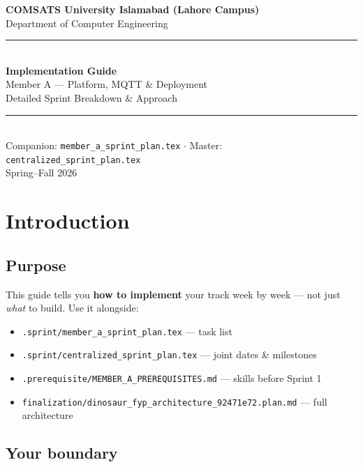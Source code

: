 \documentclass[12pt,a4paper]{report}
\begin{document}
\begin{titlepage}
\centering
\vspace*{1cm}
{\Large\color{primary}\textbf{COMSATS University Islamabad (Lahore Campus)}}\\[0.3cm]
{\large Department of Computer Engineering}\\[1cm]
\rule{\textwidth}{2pt}\\[0.8cm]
{\Huge\bfseries\color{primary} Implementation Guide}\\[0.4cm]
{\Large Member A --- Platform, MQTT \& Deployment}\\[0.2cm]
{\large Detailed Sprint Breakdown \& Approach}\\[0.3cm]
\rule{\textwidth}{2pt}\\[1cm]
{\small Companion: \texttt{member\_a\_sprint\_plan.tex} $\cdot$ Master: \texttt{centralized\_sprint\_plan.tex}}\\
\vfill
{\large Spring--Fall 2026}
\end{titlepage}

\tableofcontents
\newpage

\chapter{Introduction}

\section{Purpose}

This guide tells you \textbf{how to implement} your track week by week --- not just \textit{what} to build. Use it alongside:

\begin{itemize}
    \item \texttt{.sprint/member\_a\_sprint\_plan.tex} --- task list
    \item \texttt{.sprint/centralized\_sprint\_plan.tex} --- joint dates \& milestones
    \item \texttt{.prerequisite/MEMBER\_A\_PREREQUISITES.md} --- skills before Sprint 1
    \item \texttt{finalization/dinosaur\_fyp\_architecture\_92471e72.plan.md} --- full architecture
\end{itemize}

\section{Your boundary}
\end{document}
